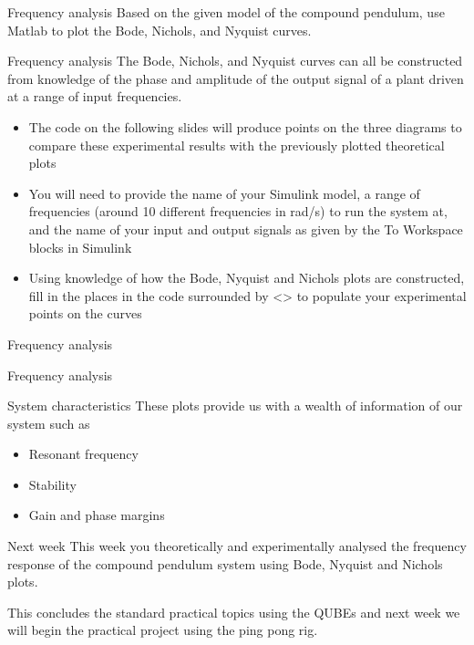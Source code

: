 \documentclass[9pt]{beamer-control}
\begin{document}
\begin{frame}{Frequency analysis}
Based on the given model of the compound pendulum, use Matlab to plot the Bode, Nichols, and Nyquist curves.


\end{frame}


\begin{frame}{Frequency analysis}
The Bode, Nichols, and Nyquist curves can all be constructed from knowledge of the phase and amplitude of the output signal of a plant driven at a range of input frequencies. 

\begin{itemize}
	\item The code on the following slides will produce points on the three diagrams to compare these experimental results with the previously plotted theoretical plots
	\item You will need to provide the name of your Simulink model, a range of frequencies (around 10 different frequencies in rad/s) to run the system at, and the name of your input and output signals as given by the To Workspace blocks in Simulink
	\item Using knowledge of how the Bode, Nyquist and Nichols plots are constructed, fill in the places in the code surrounded by <> to populate your experimental points on the curves
\end{itemize}
 
\end{frame}

\begin{frame}{Frequency analysis}
\end{frame}

\begin{frame}{Frequency analysis}
\end{frame}


\begin{frame}{System characteristics}
These plots provide us with a wealth of information of our system such as 
\begin{itemize}
	\item Resonant frequency
	\item Stability 
	\item Gain and phase margins
\end{itemize}
\end{frame}


\begin{frame}{Next week}
	This week you theoretically and experimentally analysed the frequency response of the compound pendulum system using Bode, Nyquist and Nichols plots. 
	
	This concludes the standard practical topics using the QUBEs and next week we will begin the practical project using the ping pong rig.
\end{frame}
\end{document}

